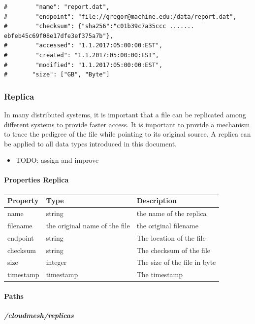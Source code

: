 \documentclass[9pt,]{article}
\providecommand{\tightlist}{%
  \setlength{\itemsep}{0pt}\setlength{\parskip}{0pt}}
\let\oldparagraph\paragraph
\renewcommand{\paragraph}[1]{\oldparagraph{#1}\mbox{}}
\let\oldsubparagraph\subparagraph
\renewcommand{\subparagraph}[1]{\oldsubparagraph{#1}\mbox{}}
\begin{document}
\begin{verbatim}
#        "name": "report.dat",
#        "endpoint": "file://gregor@machine.edu:/data/report.dat",
#        "checksum": {"sha256":"c01b39c7a35ccc ....... ebfeb45c69f08e17dfe3ef375a7b"},
#        "accessed": "1.1.2017:05:00:00:EST",
#        "created": "1.1.2017:05:00:00:EST",
#        "modified": "1.1.2017:05:00:00:EST",
#       "size": ["GB", "Byte"]
\end{verbatim}

\hypertarget{replica}{%
\subsubsection{Replica}\label{replica}}

In many distributed systems, it is important that a file can be
replicated among different systems to provide faster access. It is
important to provide a mechanism to trace the pedigree of the file while
pointing to its original source. A replica can be applied to all data
types introduced in this document.

\begin{itemize}
\tightlist
\item
  TODO: assign and improve
\end{itemize}

\hypertarget{properties-replica}{%
\paragraph{Properties Replica}\label{properties-replica}}

\begin{longtable}[]{@{}lll@{}}
\toprule
Property & Type & Description\tabularnewline
\midrule
\endhead
name & string & the name of the replica\tabularnewline
filename & the original name of the file & the original
filename\tabularnewline
endpoint & string & The location of the file\tabularnewline
checksum & string & The checksum of the file\tabularnewline
size & integer & The size of the file in byte\tabularnewline
timestamp & timestamp & The timestamp\tabularnewline
\bottomrule
\end{longtable}

\hypertarget{paths-10}{%
\paragraph{Paths}\label{paths-10}}

\hypertarget{cloudmeshreplicas}{%
\subparagraph{/cloudmesh/replicas}\label{cloudmeshreplicas}}
\end{document}
